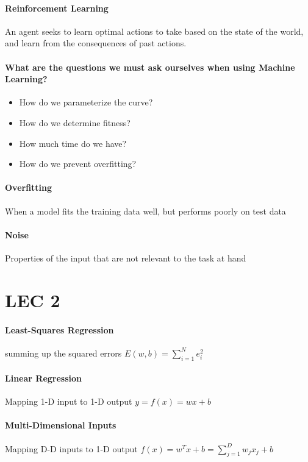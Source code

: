 \documentclass[12pt]{article}
\begin{document}
\paragraph{Reinforcement Learning} An agent seeks to learn optimal actions to take based on the state of the world, and learn from the consequences of past actions.

\paragraph{What are the questions we must ask ourselves when using Machine Learning?}

\begin{itemize}
  \item How do we parameterize the curve?
  \item How do we determine fitness?
  \item How much time do we have?
  \item How do we prevent overfitting?
\end{itemize}

\paragraph{Overfitting} When a model fits the training data well, but performs poorly on test data

\paragraph{Noise} {Properties of the input that are not relevant to the task at hand}

\section{LEC 2}

\paragraph{Least-Squares Regression} summing up the squared errors $E(w,b) = \sum^N_{i=1} e_i^2$

\paragraph{Linear Regression} Mapping 1-D input to 1-D output $y = f(x) = wx + b$

\paragraph{Multi-Dimensional Inputs} Mapping D-D inputs to 1-D output $f(x) = w^T x + b = \sum^D_{j=1} w_j x_j + b$
\end{document}
